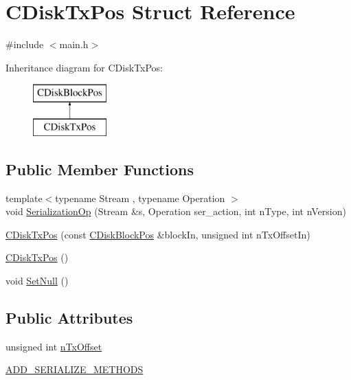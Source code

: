 \hypertarget{struct_c_disk_tx_pos}{}\section{C\+Disk\+Tx\+Pos Struct Reference}
\label{struct_c_disk_tx_pos}


{\ttfamily \#include $<$main.\+h$>$}

Inheritance diagram for C\+Disk\+Tx\+Pos\+:\begin{figure}[H]
\begin{center}
\leavevmode
\includegraphics[height=2.000000cm]{struct_c_disk_tx_pos}
\end{center}
\end{figure}
\subsection*{Public Member Functions}
\begin{DoxyCompactItemize}
\item 
{\footnotesize template$<$typename Stream , typename Operation $>$ }\\void \hyperlink{struct_c_disk_tx_pos_a1a68f1de894f0791a7ad64e3e6ea6fd6}{Serialization\+Op} (Stream \&s, Operation ser\+\_\+action, int n\+Type, int n\+Version)
\item 
\hyperlink{struct_c_disk_tx_pos_ab823a4c83ec90c8223544051f11e65fd}{C\+Disk\+Tx\+Pos} (const \hyperlink{struct_c_disk_block_pos}{C\+Disk\+Block\+Pos} \&block\+In, unsigned int n\+Tx\+Offset\+In)
\item 
\hyperlink{struct_c_disk_tx_pos_a2026598d28ffcadfd40452f702bcac46}{C\+Disk\+Tx\+Pos} ()
\item 
void \hyperlink{struct_c_disk_tx_pos_a22eb47d077f9c355373772eb42853fcf}{Set\+Null} ()
\end{DoxyCompactItemize}
\subsection*{Public Attributes}
\begin{DoxyCompactItemize}
\item 
unsigned int \hyperlink{struct_c_disk_tx_pos_af19fa085a69ba3bac7b52413a37adf23}{n\+Tx\+Offset}
\item 
\hyperlink{struct_c_disk_tx_pos_a2990c083fbbd0fb5f5aa4115e540cd21}{A\+D\+D\+\_\+\+S\+E\+R\+I\+A\+L\+I\+Z\+E\+\_\+\+M\+E\+T\+H\+O\+D\+S}
\end{DoxyCompactItemize}


